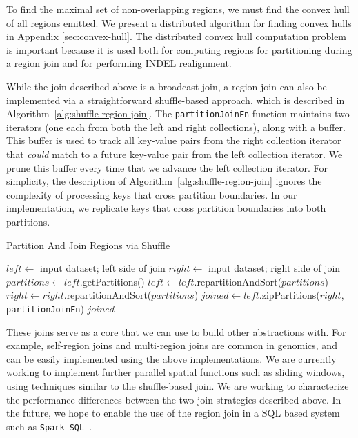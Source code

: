 \documentclass[phd]{ucbthesis}
\begin{document}
To find the maximal set of non-overlapping regions, we must find the convex hull of all regions emitted.
We present a distributed algorithm for finding convex hulls in Appendix \ref{sec:convex-hull}. The
distributed convex hull computation problem is important because it is used both for computing regions
for partitioning during a region join and for performing INDEL realignment.

While the join described above is a broadcast join, a region join can also be implemented via a straightforward
shuffle-based approach, which is described in Algorithm~\ref{alg:shuffle-region-join}. The \texttt{partitionJoinFn}
function maintains two iterators (one each from both the left and right collections), along with a buffer. This buffer is
used to track all key-value pairs from the right collection iterator that \emph{could} match to a future key-value pair
from the left collection iterator. We prune this buffer every time that we advance the left collection iterator. For
simplicity, the description of Algorithm~\ref{alg:shuffle-region-join} ignores the complexity of processing keys that cross
partition boundaries. In our implementation, we replicate keys that cross partition boundaries into both partitions.

\begin{algorithm}
\caption{Partition And Join Regions via Shuffle}
\label{alg:shuffle-region-join}
\begin{algorithmic}
\STATE $left \leftarrow$ input dataset; left side of join
\STATE $right \leftarrow$ input dataset; right side of join
\STATE $partitions \leftarrow left$.getPartitions()
\STATE $left \leftarrow left$.repartitionAndSort($partitions$)
\STATE $right \leftarrow right$.repartitionAndSort($partitions$)
\STATE $joined \leftarrow left$.zipPartitions($right$, \texttt{partitionJoinFn})
\RETURN $joined$
\end{algorithmic}
\end{algorithm}

These joins serve as a core that we can use to build other abstractions with. For example, self-region joins and
multi-region joins are common in genomics, and can be easily implemented using the above implementations.
We are currently working to implement further parallel spatial functions such as sliding windows, using techniques
similar to the shuffle-based join. We are working to characterize the performance differences between the two
join strategies described above. In the future, we hope to enable the use of the region join in a SQL based system
such as \texttt{Spark SQL}~\cite{armbrust15}.
\end{document}
